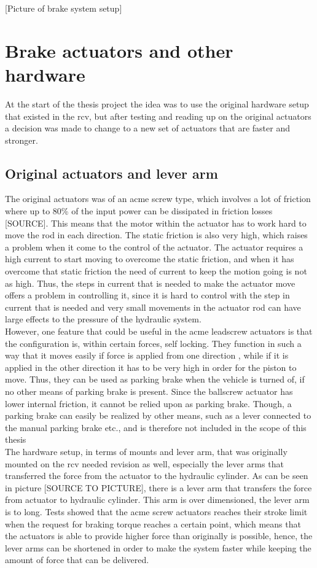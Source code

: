 \documentclass[a4paper,11pt]{kth-mag}
\begin{document}
[Picture of brake system setup]

\section{Brake actuators and other hardware}
At the start of the thesis project the idea was to use the original hardware setup that existed in the \gls{rcv}, but after testing and reading up on the original actuators a decision was made to change to a new set of actuators that are faster and stronger. 

\subsection{Original actuators and lever arm}
The original actuators was of an acme screw type, which involves a lot of friction where up to 80\% of the input power can be dissipated in friction losses [SOURCE]. This means that the motor within the actuator has to work hard to move the rod in each direction. The static friction is also very high, which raises a problem when it come to the control of the actuator. The actuator requires a high current to start moving to overcome the static friction, and when it has overcome that static friction the need of current to keep the motion going is not as high. Thus, the steps in current that is needed to make the actuator move offers a problem in controlling it, since it is hard to control with the step in current that is needed and very small movements in the actuator rod can have large effects to the pressure of the hydraulic system. \\

However, one feature that could be useful in the acme leadscrew actuators is that the configuration is, within certain forces, self locking. They function in such a way that it moves easily if force is applied from one direction , while if it is applied in the other direction it has to be very high in order for the piston to move. Thus, they can be used as parking brake when the vehicle is turned of, if no other means of parking brake is present. Since the ballscrew actuator has lower internal friction, it cannot be relied upon as parking brake. Though, a parking brake can easily be realized by other means, such as a lever  connected to the manual parking brake etc., and is therefore not included in the scope of this thesis\\

The hardware setup, in terms of mounts and lever arm, that was originally mounted on the \gls{rcv} needed revision as well, especially the lever arms that transferred the force from the actuator to the hydraulic cylinder. As can be seen in picture [SOURCE TO PICTURE], there is a lever arm that transfers the force from actuator to hydraulic cylinder. This arm is over dimensioned, the lever arm is to long. Tests showed that the acme screw actuators reaches their stroke limit when the request for braking torque reaches a certain point, which means that the actuators is able to provide higher force than  originally is possible, hence, the lever arms can be shortened in order to make the system faster while keeping the amount of force that can be delivered. 
\end{document}
